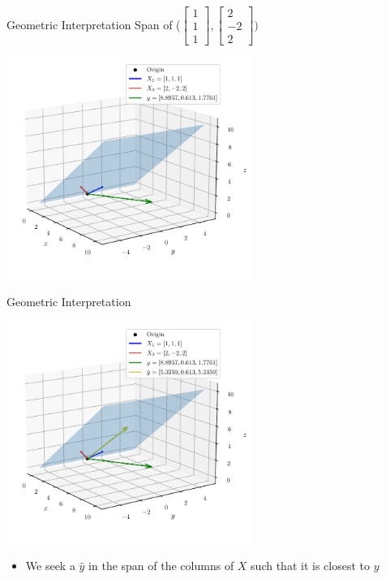 \documentclass{beamer}
\begin{document}
\begin{frame}{Geometric Interpretation}
Span of ($\begin{bmatrix}
1 \\1\\1
\end{bmatrix}, \begin{bmatrix}
2 \\-2\\2
\end{bmatrix}) $


\includegraphics[width=0.6\textwidth]{../assets/linear-regression/figures/geometric-2.pdf}

\end{frame}


\begin{frame}{Geometric Interpretation}	

    \includegraphics[width=0.6\textwidth]{../assets/linear-regression/figures/geometric-3.pdf}

    


\begin{itemize}[<+->]
\item We seek a $\hat{y}$ in the span of the columns of $X$ such that it is closest to $y$
\end{itemize}

\end{frame}
\end{document}
